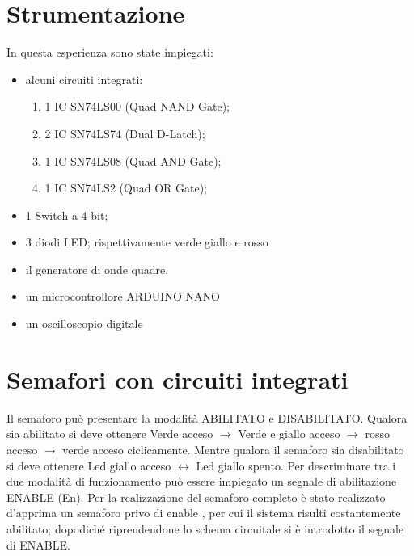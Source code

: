 \section{Strumentazione}
	In questa esperienza sono state impiegati:
	\begin{itemize}
		\item alcuni circuiti integrati:
		\begin{enumerate}
			\item 1 IC SN74LS00 (Quad NAND Gate);
			\item 2 IC SN74LS74 (Dual D-Latch);
			\item 1 IC SN74LS08 (Quad AND Gate);
			\item 1 IC SN74LS2 (Quad OR Gate);
		\end{enumerate}
		\item 1 Switch a 4 bit;
		\item 3 diodi LED; rispettivamente verde giallo e rosso
		\item il generatore di onde quadre.
		\item un microcontrollore ARDUINO NANO
		\item un oscilloscopio digitale
	\end{itemize}
\section{Semafori con circuiti integrati }
Il semaforo può presentare la modalità ABILITATO e DISABILITATO. Qualora sia abilitato si deve 
ottenere Verde acceso $\longrightarrow$ Verde e 
giallo acceso $\longrightarrow$ rosso acceso $\longrightarrow$ 
verde acceso  ciclicamente. Mentre qualora il semaforo sia disabilitato si deve ottenere
Led giallo acceso $\leftrightarrow$ Led giallo spento.
Per descriminare tra i due modalità di funzionamento può essere impiegato un segnale di abilitazione 
ENABLE (En).
Per la realizzazione del semaforo completo è stato realizzato d'apprima un semaforo privo di enable , per cui il sistema risulti costantemente abilitato;
dopodiché riprendendone lo schema circuitale si è introdotto il segnale di ENABLE.
